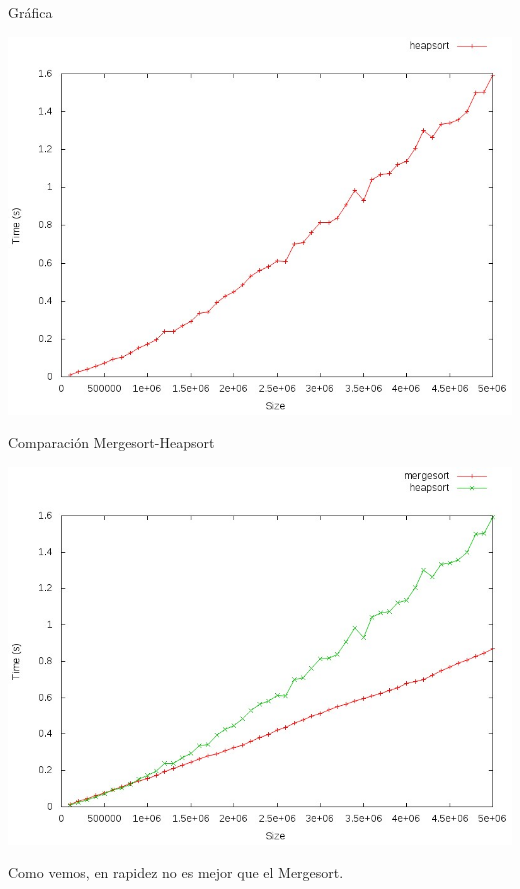 \documentclass[compress]{beamer}
\begin{document}
\begin{frame}{Gráfica}
	\begin{alertblock}{}
		\begin{center}
		\includegraphics[scale=0.40]{images/heapsort.jpeg}
		\end{center}
	\end{alertblock}
\end{frame}

\begin{frame}{Comparación Mergesort-Heapsort}
	\begin{alertblock}{}
		\begin{center}
		\includegraphics[scale=0.32]{images/merg-heap.jpeg}
		\end{center}
	\end{alertblock}
Como vemos, en rapidez no es mejor que el Mergesort.
\end{frame}
\end{document}
